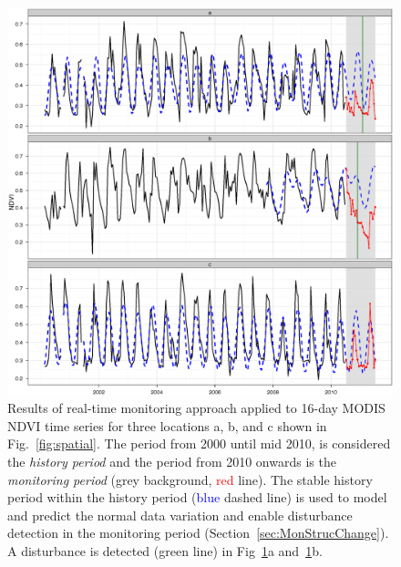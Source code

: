 \documentclass[authoryear,preprint,review,10pt]{elsarticle}
\begin{document}
\begin{figure}[htp]
\centering
    \includegraphics[width=1\textwidth]{figs/tsexampleSOM.eps}
  \caption{
 Results of real-time monitoring approach applied to 16-day MODIS NDVI time series for three locations a, b, and c shown in Fig.~\ref{fig:spatial}. The period from 2000 until mid 2010, is considered the \emph{history period} and the period from 2010 onwards is the \emph{monitoring period} (grey background, \textcolor{red} {red} line). The stable history period within the history period (\textcolor{blue} {blue} dashed line) is used to model and predict the normal data variation and enable disturbance detection in the monitoring period (Section~\ref{sec:MonStrucChange}).  A disturbance is detected (\textcolor{OliveGreen} {green} line) in Fig~\ref{fig:realmon}a and~\ref{fig:realmon}b.}
  \label{fig:realmon}
\end{figure}
 
\end{document}
